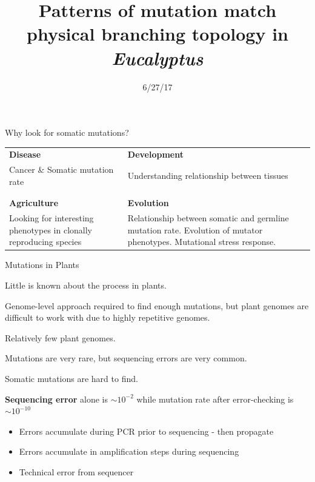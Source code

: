 \documentclass{beamer}
\title[Eucalyptus Mutation Topology]{Patterns of mutation match physical branching topology in \textit{Eucalyptus}}
\date{6/27/17}
\author{Adam Orr\hskip 1em \faicon{twitter}@AdamJOrr}
\begin{document}
\frame{\titlepage}

\begin{frame}{Why look for somatic mutations?}
	\begin{tabu} to .95\textwidth { X[c] | X[c] }
	\textbf{Disease} & \textbf{Development}
	\\
	Cancer \& Somatic mutation rate & Understanding relationship between tissues
	\\
	\\
	\hline
	\\
	\textbf{Agriculture} & \textbf{Evolution}
	\\
	Looking for interesting phenotypes in clonally reproducing species & Relationship between somatic and germline mutation rate. Evolution of mutator phenotypes. Mutational stress response.
	\end{tabu}
\end{frame}

\begin{frame}{Mutations in Plants}

	Little is known about the process in plants.

	\vfill

	Genome-level approach required to find enough mutations, but plant genomes are difficult to work with due to highly repetitive genomes.

	\vfill

	Relatively few plant genomes.



\end{frame}

\begin{frame}{Mutations are very rare, but sequencing errors are very common.}

Somatic mutations are hard to find.

\vfill

\textbf{Sequencing error} alone is \textbf{$\sim10^{-2}$} while mutation rate after error-checking is \textbf{$\sim10^{-10}$}

\begin{itemize}
\item Errors accumulate during PCR prior to sequencing - then propagate
\item Errors accumulate in amplification steps during sequencing
\item Technical error from sequencer
\end{itemize}

\end{frame}
\end{document}
